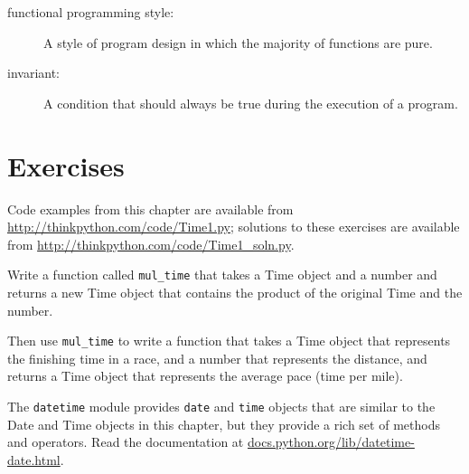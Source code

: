 \documentclass[10pt]{book}
\begin{document}
\begin{CJK}{UTF8}{gbsn}
\begin{description}
\item[functional programming style:] A style of program design in which the
majority of functions are pure.

\item[invariant:] A condition that should always be true during the
execution of a program.

\end{description}


\section{Exercises}

Code examples from this chapter are available from
\url{http://thinkpython.com/code/Time1.py}; solutions to these
exercises are available from \url{http://thinkpython.com/code/Time1_soln.py}.

\begin{exercise}

Write a function called \verb"mul_time" that takes a Time object
and a number and returns a new Time object that contains
the product of the original Time and the number.

Then use \verb"mul_time" to write a function that takes a Time
object that represents the finishing time in a race, and a number
that represents the distance, and returns a Time object that represents
the average pace (time per mile).

\end{exercise}





\begin{exercise}

The {\tt datetime} module provides {\tt date} and {\tt time} objects
that are similar to the Date and Time objects in this chapter, but
they provide a rich set of methods and operators.  Read the
documentation at \url{docs.python.org/lib/datetime-date.html}.


\end{exercise}
\end{CJK}
\end{document}
